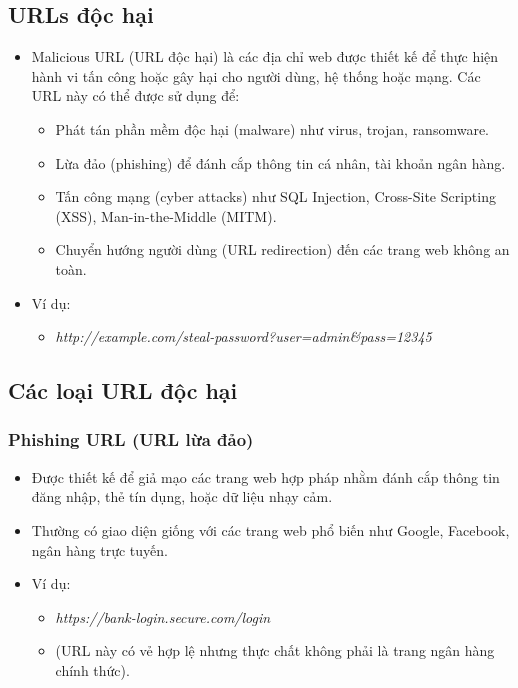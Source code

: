 \documentclass[13pt]{article}
\begin{document}
\subsection{URLs độc hại}
\begin{itemize}
    \item Malicious URL (URL độc hại) là các địa chỉ web được thiết kế để thực hiện hành vi tấn công hoặc gây hại cho người dùng, hệ thống hoặc mạng. Các URL này có thể được sử dụng để:
    \begin{itemize}
        \item Phát tán phần mềm độc hại (malware) như virus, trojan, ransomware.
        \item Lừa đảo (phishing) để đánh cắp thông tin cá nhân, tài khoản ngân hàng.
        \item Tấn công mạng (cyber attacks) như SQL Injection, Cross-Site Scripting (XSS), Man-in-the-Middle (MITM).
        \item Chuyển hướng người dùng (URL redirection) đến các trang web không an toàn.
    \end{itemize}
    \item Ví dụ:
    \begin{itemize}
        \item \textit{http://example.com/steal-password?user=admin&pass=12345}
    \end{itemize}
\end{itemize}

\subsection{Các loại URL độc hại}
\subsubsection{Phishing URL (URL lừa đảo)}
\begin{itemize}
    \item Được thiết kế để giả mạo các trang web hợp pháp nhằm đánh cắp thông tin đăng nhập, thẻ tín dụng, hoặc dữ liệu nhạy cảm.
    \item Thường có giao diện giống với các trang web phổ biến như Google, Facebook, ngân hàng trực tuyến.
    \item Ví dụ:
    \begin{itemize}
        \item \textit{https://bank-login.secure.com/login}
        \item (URL này có vẻ hợp lệ nhưng thực chất không phải là trang ngân hàng chính thức).
    \end{itemize}
\end{itemize}
\end{document}
